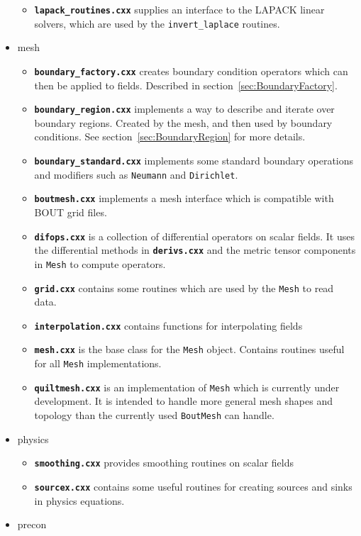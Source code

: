 \documentclass[12pt]{article}
\newcommand{\code}[1]{\texttt{#1}}
\newcommand{\file}[1]{\texttt{\bf #1}}
\begin{document}
\begin{itemize}
\begin{itemize}
  \item \file{lapack\_routines.cxx} supplies an interface to the LAPACK linear
    solvers, which are used by the \code{invert\_laplace} routines.
  \end{itemize}
\item mesh
  \begin{itemize}
  \item \file{boundary\_factory.cxx} creates boundary condition operators
    which can then be applied to fields. Described in
    section~\ref{sec:BoundaryFactory}.
  \item \file{boundary\_region.cxx} implements a way to describe and iterate
    over boundary regions. Created by the mesh, and then used by boundary
    conditions. See section~\ref{sec:BoundaryRegion} for more details.
  \item \file{boundary\_standard.cxx} implements some standard boundary
    operations and modifiers such as \code{Neumann} and \code{Dirichlet}.
  \item \file{boutmesh.cxx} implements a mesh interface which is compatible
    with BOUT grid files.
  \item \file{difops.cxx} is a collection of differential operators on scalar
    fields. It uses the differential methods in \file{derivs.cxx} and the
    metric tensor components in \code{Mesh} to compute operators.
  \item \file{grid.cxx} contains some routines which are used by the \code{Mesh}
    to read data. 
  \item \file{interpolation.cxx} contains functions for interpolating fields
  \item \file{mesh.cxx} is the base class for the \code{Mesh} object. Contains
    routines useful for all \code{Mesh} implementations.
  \item \file{quiltmesh.cxx} is an implementation of \code{Mesh} which is
    currently under development. It is intended to handle more general mesh
    shapes and topology than the currently used \code{BoutMesh} can handle.
  \end{itemize}
\item physics
  \begin{itemize}
  \item \file{smoothing.cxx} provides smoothing routines on scalar fields
  \item \file{sourcex.cxx} contains some useful routines for creating
    sources and sinks in physics equations.
  \end{itemize}
\item precon

\end{itemize}
\end{document}
